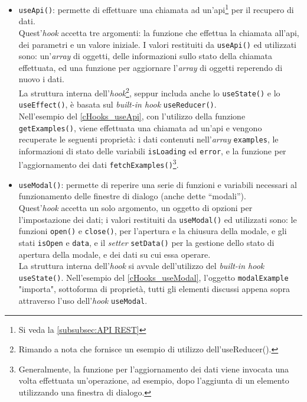 \begin{itemize}
  \item {\texttt{useApi()}}: permette di effettuare una chiamata ad un'\acrshort{api}\footnote{Si veda la \autoref{subsubsec:API REST}} per il recupero di dati.\\
  Quest'\textit{hook} accetta tre argomenti: la funzione che effettua la chiamata all'\acrshort{api}, dei parametri e un valore iniziale. I valori restituiti da \texttt{useApi()} ed utilizzati sono: un'\textit{array} di oggetti, delle informazioni sullo stato della chiamata effettuata, ed una funzione per aggiornare l'\textit{array} di oggetti reperendo di nuovo i dati.\\
  La struttura interna dell'\textit{hook}\footnote{Rimando a nota che fornisce un esempio di utilizzo dell'useReducer().}, seppur includa anche lo \texttt{useState()} e lo \texttt{useEffect()}, è basata sul \textit{built-in hook} \texttt{useReducer()}.\\
  Nell'esempio del \autoref{cHooks_useApi}, con l'utilizzo della funzione \texttt{getExamples()}, viene effettuata una chiamata ad un'\acrshort{api} e vengono recuperate le seguenti proprietà: i dati contenuti nell'\textit{array} \texttt{examples}, le informazioni di stato delle variabili \texttt{isLoading} ed \texttt{error}, e la funzione per l'aggiornamento dei dati \texttt{fetchExamples()}\footnote{Generalmente, la funzione per l'aggiornamento dei dati viene invocata una volta effettuata un'operazione, ad esempio, dopo l'aggiunta di un elemento utilizzando una finestra di dialogo.}.
  
  

  \item {\texttt{useModal()}}: permette di reperire una serie di funzioni e variabili necessari al funzionamento delle finestre di dialogo (anche dette “modali”).\\
  Quest'\textit{hook} accetta un solo argomento, un oggetto di opzioni per l'impostazione dei dati; i valori restituiti da \texttt{useModal()} ed utilizzati sono: le funzioni \texttt{open()} e \texttt{close()}, per l'apertura e la chiusura della modale, e gli stati \texttt{isOpen} e \texttt{data}, e il \textit{setter} \texttt{setData()} per la gestione dello stato di apertura della modale, e dei dati su cui essa operare.\\
  La struttura interna dell'\textit{hook} si avvale dell'utilizzo del \textit{built-in hook} \texttt{useState()}.
  Nell'esempio del \autoref{cHooks_useModal}, l'oggetto \texttt{modalExample} "importa", sottoforma di proprietà, tutti gli elementi discussi appena sopra attraverso l'uso dell'\textit{hook} \texttt{useModal}.
  

\end{itemize}
